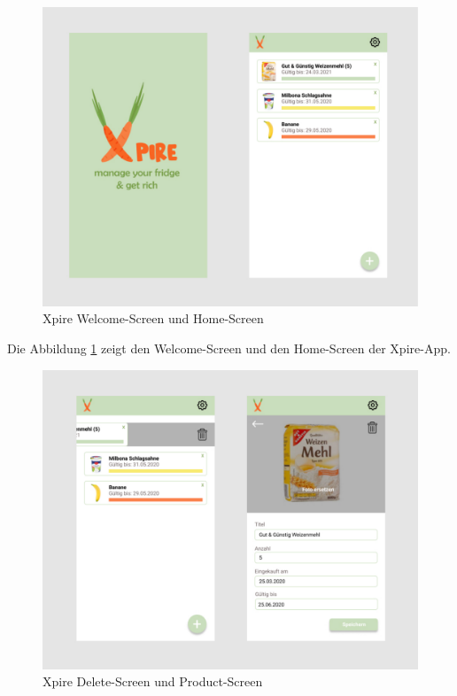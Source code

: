 \begin{figure}[hbt!]
	\centering
	\includegraphics[width=1.0\textwidth]{img/Prototype_01.pdf}
	\caption{Xpire Welcome-Screen und Home-Screen}
	\label{fig:prot1}
\end{figure}
Die Abbildung \ref{fig:prot1} zeigt den Welcome-Screen und den Home-Screen der Xpire-App.


\begin{figure} 
	\centering
	\includegraphics[width=1.0\textwidth]{img/Prototpye_02.pdf}
	\caption{Xpire Delete-Screen und Product-Screen}
	\label{fig:prot2}
\end{figure}
